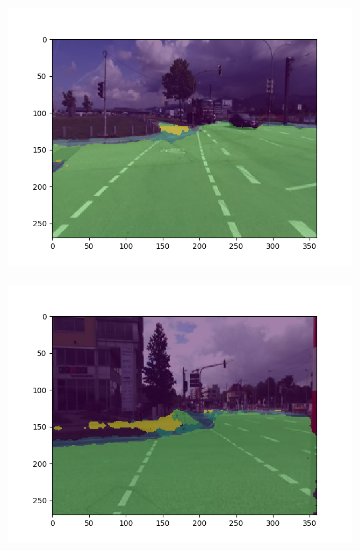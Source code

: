 \begin{figure}
	\centering
	\begin{subfigure}{.45\textwidth}
		\centering
		\includegraphics[width=\linewidth]{figures/experiments/results-obelix/1.png}
		\caption[Obelix Segmentation Result 1]{}
		\label{fig:obresult-1}
	\end{subfigure}
	\hfill
	\begin{subfigure}{.45\textwidth}
		\centering
		\includegraphics[width=\linewidth]{figures/experiments/results-obelix/2.png}
		\caption[Obelix Segmentation Result 2]{}
		\label{fig:obresult-2}
	\end{subfigure}
	
	\vspace{12pt}%
	

\end{figure}
